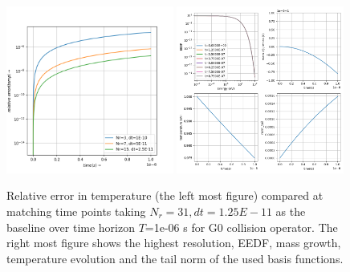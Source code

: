 \documentclass{article}
\begin{document}
\begin{figure}[H]
	\centering
	\includegraphics[width=0.49\textwidth]{fig/g0_temp_convergence.png}
	\includegraphics[width=0.49\textwidth]{fig/g0_dt_1.25000000E-11_Nr_31.dat.png}
	\caption{Relative error in temperature (the left most figure) compared at matching time points taking $N_r=31,dt=1.25E-11$ as the baseline over time horizon $T$=1e-06 s for G0 collision operator. The right most figure shows the highest resolution, EEDF, mass growth, temperature evolution and the tail norm of the used basis functions.  }
\end{figure}
\end{document}
